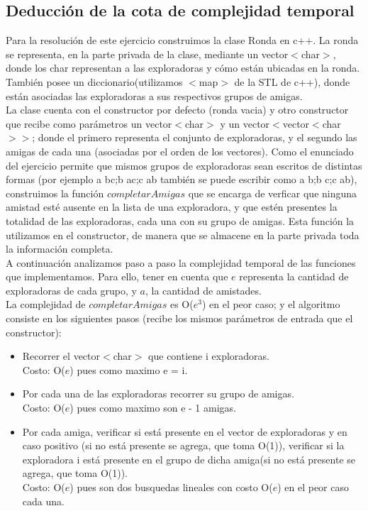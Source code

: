 \subsection{Deducción de la cota de complejidad temporal}

Para la resolución de este ejercicio construimos la clase Ronda en c++. La ronda se representa, en la parte privada de la clase,
mediante un vector$<$char$>$, donde los char representan a las exploradoras y cómo están ubicadas en la ronda. También posee un 
diccionario(utilizamos $<$map$>$ de la STL de c++), donde están asociadas las exploradoras a sus respectivos grupos de amigas. \\
La clase cuenta con el constructor por defecto (ronda vacia) y otro constructor que recibe como parámetros un vector$<$char$>$ y un
vector$<$vector$<$char$>>$; donde el primero representa el conjunto de exploradoras, y el segundo las amigas de cada una (asociadas
por el orden de los vectores). Como el enunciado del ejercicio permite que mismos grupos de exploradoras sean escritos de distintas 
formas (por ejemplo a bc;b ac;c ab también se puede escribir como a b;b c;c ab), construimos la función $completarAmigas$ que se 
encarga de verficar que ninguna amistad esté ausente en la lista de una exploradora, y que estén presentes la totalidad de las 
exploradoras, cada una con su grupo de amigas. Esta función la utilizamos en el constructor, de manera que se almacene en la parte 
privada toda la información completa. \\
A continuación analizamos paso a paso la complejidad temporal de las funciones que implementamos. Para ello, tener en cuenta que 
$e$ representa la cantidad de exploradoras de cada grupo, y $a$, la cantidad de amistades. \\
La complejidad de $completarAmigas$ es O($e^3$) en el peor caso; y el algoritmo consiste en los siguientes pasos (recibe los mismos parámetros de entrada que el constructor): \\
\begin{itemize}
\item Recorrer el vector$<$char$>$ que contiene i exploradoras. \\
Costo: O($e$) pues como maximo  e = i. 
\item Por cada una de las exploradoras recorrer su grupo de amigas. \\
Costo: O($e$) pues como maximo son e - 1 amigas.
\item Por cada amiga, verificar si está presente en el vector de exploradoras y en caso positivo (si no está presente se agrega, que 
toma O(1)), verificar si la exploradora i está presente en el grupo de dicha amiga(si no está presente se agrega, que 
toma O(1)).  \\
Costo: O($e$) pues son dos busquedas lineales con costo O($e$) en el peor caso cada una.
\end{itemize}
